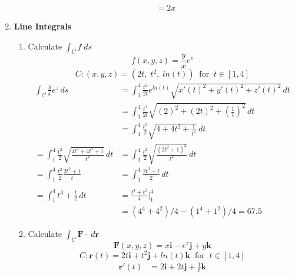 \documentclass[11pt]{article}
\begin{document}
\begin{preview}
\begin{enumerate}
\begin{enumerate}
\begin{align*}
                                      & = 2x
                  \end{align*}
          \end{enumerate}
    \item \textbf{Line Integrals}
          \begin{enumerate}
            \item Calculate $\int_C f \; ds$
                  $$ f(x,y,z) = \frac{y}{x}e^z $$
                  $$C: (x,y,z) = (2t, \; t^2, \; ln(t)) \;\;\mathrm{for} \;\; t \in [1,4]$$
                  \begin{align*}
                    \int_C \frac{y}{x}e^z \,ds                                           & = \int_{1}^{4} \frac{t^2}{2t}e^{ln(t)} \sqrt{x'(t)^{2} + y'(t)^2 + z'(t)^2} \,dt        \\
                                                                                         & = \int_{1}^{4} \frac{t^3}{2t} \sqrt{(2)^{2} + (2t)^2 + \left(\frac{1}{t}\right)^2} \,dt \\
                                                                                         & = \int_{1}^{4} \frac{t^2}{2} \sqrt{4 + 4t^2 + \frac{1}{t^2}} \,dt                       \\
                    = \int_{1}^{4} \frac{t^2}{2} \sqrt{\frac{4t^4 + 4t^2 + 1}{t^2}} \,dt & = \int_{1}^{4} \frac{t^2}{2} \sqrt{\frac{(2t^2 + 1)^{2}}{t^2}} \,dt                     \\
                    = \int_{1}^{4} \frac{t^2}{2} \frac{2t^2 + 1}{t}                      & = \int_{1}^{4} \frac{2t^3 + t}{2} \,dt                                                  \\ \\
                    = \int_{1}^{4} t^3 + \frac{t}{2} \,dt                                & = \frac{t^4 + t^2}{4} \Big|_{1}^{4}                                                     \\
                                                                                         & = (4^4 + 4^2)/4 - (1^4 + 1^2)/4=67.5
                  \end{align*}
            \item Calculate $\int_C \textbf{F} \cdot \; d \textbf{r}$
                  $$ \textbf{F}(x,y,z) = x \textbf{i} - e^{z}\textbf{j} + y \textbf{k} $$
                  $$C: \textbf{r}(t) = 2t \textbf{i} + t^2 \textbf{j} + ln(t) \textbf{k} \;\;\mathrm{for} \;\; t \in [1,4]$$
                  \begin{align*}
                    \textbf{r}'(t)                          & = 2 \textbf{i} + 2t \textbf{j} + \frac{1}{t} \textbf{k}                                                                                                        \\\\

\end{align*}
\end{enumerate}
\end{enumerate}
\end{preview}
\end{document}
